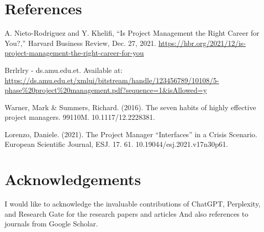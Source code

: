 \documentclass{article}
\begin{document}
\section*{References}
\vspace*{-35pt}
\renewcommand{\refname}{}
\begin{thebibliography}{99}
A. Nieto-Rodriguez and Y. Khelifi, “Is Project Management the Right Career for You?,” Harvard Business Review, Dec. 27, 2021. \url{https://hbr.org/2021/12/is-project-management-the-right-career-for-you}

Brrlrlry - ds.amu.edu.et. Available at: 
\url{https://ds.amu.edu.et/xmlui/bitstream/handle/123456789/10108/5-phase%20project%20management.pdf?sequence=1&isAllowed=y}

Warner, Mark \& Summers, Richard. (2016). The seven habits of highly effective project managers. 99110M. 10.1117/12.2228381.

Lorenzo, Daniele. (2021). The Project Manager “Interfaces” in a Crisis Scenario. European Scientific Journal, ESJ. 17. 61. 10.19044/esj.2021.v17n30p61. 

\end{thebibliography}

\newpage

\section{Acknowledgements}
I would like to acknowledge the invaluable contributions of ChatGPT, Perplexity, and Research Gate for the research papers and articles And also references to journals from Google Scholar.
\end{document}
